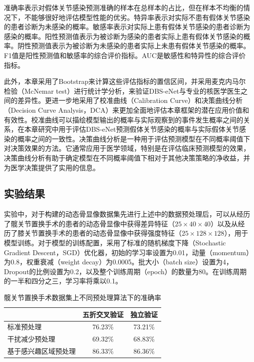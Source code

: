 准确率表示对假体关节感染预测准确的样本在总样本的占比，但在样本不均衡的情况下，不能够很好地评估模型性能的优劣。特异率表示对实际不患有假体关节感染的患者诊断为未感染的概率。敏感率表示对实际上患有假体关节感染的患者诊断为感染的概率。阳性预测值表示为被诊断为感染的患者实际上患有假体关节感染的概率。阴性预测值表示为被诊断为未感染的患者实际上未患有假体关节感染的概率。F1值是阳性预测值和敏感率的综合评价指标。AUC是敏感性和特异性的综合评价指标。

此外，本章采用了Bootstrap\cite{hesterberg2011bootstrap}来计算这些评估指标的置信区间，并采用麦克内马尔检验（McNemar test）\cite{lachenbruch2014mcnemar}进行统计学分析，来验证DBS-eNet与专业的核医学医生之间的差异性。更进一步地采用了校准曲线（Calibration Curve）和决策曲线分析（Decision Curve Analysis，DCA）\cite{vickers2006decision}来更加全面地评估本章框架的潜在应用价值和有效性。校准曲线可以描绘模型输出的概率与实际观察到的事件发生概率之间的关系，在本章研究中用于评估DBS-eNet预测假体关节感染的概率与实际假体关节感染的概率之间的一致性。决策曲线分析是一种用于评估预测模型在不同概率阈值下对决策效果的方法。它通常应用于医学领域，特别是在评估临床预测模型的效果，决策曲线分析有助于确定模型在不同概率阈值下相对于其他决策策略的净收益，并为医学决策提供了实用的信息。

\subsection{实验结果}

实验中，对于构建的动态骨显像数据集先进行上述中的数据预处理后，可以从经历了髋关节置换手术的患者的动态骨显像中获得差异特征（\(25\times40\times40\)）以及从经历了膝关节置换手术的患者的动态骨显像中获得强度特征（\(25\times128\times128\)），用于模型训练。对于模型的训练配置，采用了标准的随机梯度下降（Stochastic Gradient Descent，SGD）优化器，初始的学习率设置为0.01，动量（momentum）为0.8，权重衰减（weight decay）为0.0005。批大小（batch size）设置为4，Dropout的比例设置为0.2，以及整个训练周期（epoch）的数量为80。在训练周期的一半和四分之三，学习率将乘以0.1。

\begin{table}[htbp]
  \centering
  \caption{髋关节置换手术数据集上不同预处理算法下的准确率}
  \begin{tabular}{lcc}
    \toprule
                         & 五折交叉验证 & 独立验证 \\
    \midrule
    标准预处理           & 76.23\%      & 73.21\%  \\
    干扰减少预处理       & 69.32\%      & 68.83\%  \\
    基于感兴趣区域预处理 & 86.33\%      & 86.36\%  \\
    \bottomrule
  \end{tabular}
  \label{tab:chap03_experiment_pre}
\end{table}

